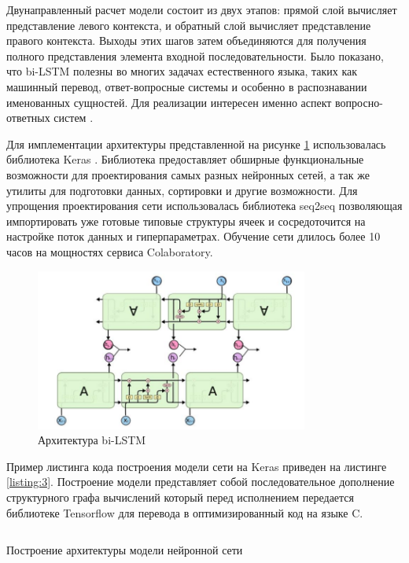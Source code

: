 Двунаправленный расчет модели состоит из двух этапов: прямой слой вычисляет представление левого контекста, и обратный слой вычисляет представление правого контекста. Выходы этих шагов затем объединяются для получения полного представления элемента входной последовательности. Было показано, что bi-LSTM полезны во многих задачах естественного языка, таких как машинный перевод, ответ-вопросные системы и особенно в распознавании именованных сущностей. Для реализации интересен именно аспект вопросно-ответных систем \cite{распознаваниесущностей}. 

Для имплементации архитектуры представленной на рисунке \ref{fig:lstm} использовалась библиотека Keras \cite{keras}. Библиотека предоставляет обширные функциональные возможности для проектирования самых разных нейронных сетей, а так же утилиты для подготовки данных, сортировки и другие возможности. Для упрощения проектирования сети использовалась библиотека seq2seq \cite{Britz:2017} позволяющая импортировать уже готовые типовые структуры ячеек и сосредоточится на настройке поток данных и гиперпараметрах. Обучение сети длилось более 10 часов на мощностях сервиса Colaboratory. 

\begin{figure}[H]
    \centering
    \includegraphics[width=0.8\textwidth]{image/bi-LSTM.png}
    \caption{Архитектура bi-LSTM}
    \label{fig:lstm}
\end{figure}

Пример листинга кода построения модели сети на Keras приведен на листинге \ref{listing:3}. Построение модели представляет собой последовательное дополнение структурного графа вычислений который перед исполнением передается библиотеке Tensorflow для перевода в оптимизированный код на языке C.  

\begin{listing}[H]
\inputminted[breaklines, breakanywhere, linenos, fontsize=\small]{python}{source/keras.py}
\caption{Построение архитектуры модели нейронной сети}
\label{listing:3}
\end{listing}

